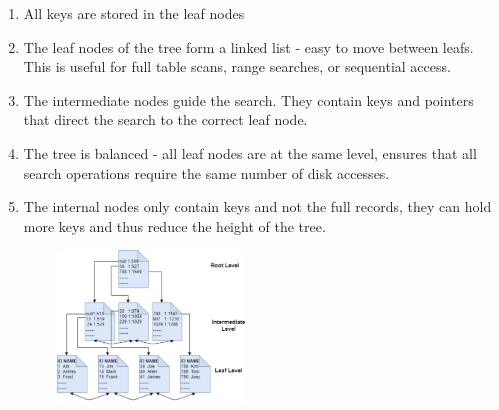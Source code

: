 \begin{enumerate}[noitemsep,leftmargin=*]
\item{All keys are stored in the leaf nodes}
\item{The leaf nodes of the tree form a linked list - easy to move between leafs. This is useful for full table scans, range searches, or sequential access.}
\item{The intermediate nodes guide the search. They contain keys and pointers that direct the search to the correct leaf node.}
\item{The tree is balanced - all leaf nodes are at the same level, ensures that all search operations require the same number of disk accesses.}
\item{The internal nodes only contain keys and not the full records, they can hold more keys and thus reduce the height of the tree.}
\end{enumerate}


\begin{center}
\includegraphics[width=8cm,height=4cm]{memory_related/b_tree/b_tree_img}
\end{center}

